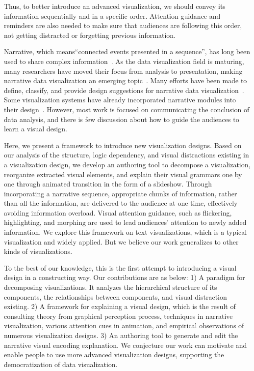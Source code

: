 Thus, to better introduce an advanced visualization, we should convey its information sequentially and in a specific order. Attention guidance and reminders are also needed to make sure that audiences are following this order, not getting distracted or forgetting previous information.

Narrative, which means``connected events presented in a sequence'', has long been used to share complex information~\cite{schmidt_living_2017}. As the data visualization field is maturing, many researchers have moved their focus from analysis to presentation, making narrative data visualization an emerging topic~\cite{kosara_storytelling:_2013}. Many efforts have been
made to define, classify, and provide design suggestions for narrative data visualization~\cite{segel_narrative_2010,hullman_deeper_2013,gershon_what_2001}. Some visualization systems have already incorporated narrative modules into their design~\cite{eccles_stories_2007,bryan_temporal_2016}. However, most work is focused on communicating the conclusion of data analysis, and there is few discussion about how to guide the audiences to learn a visual design. 

Here, we present a framework to introduce new visualization designs. Based on our analysis of the structure, logic dependency, and visual distractions existing in a visualization design, we develop an authoring tool to decompose a visualization, reorganize extracted visual elements, and explain their visual grammars one by one through animated transition in the form of a slideshow. Through incorporating a narrative sequence, appropriate chunks of information, rather than all the information, are delivered to the audience at one time, effectively avoiding information overload. Visual attention guidance, such as flickering, highlighting, and morphing are used to lead audiences' attention to newly added information. We explore this framework on text visualizations, which is a typical visualization and widely applied. But we believe our work generalizes to other kinds of visualizations. 

To the best of our knowledge, this is the first attempt to introducing a visual design in a constructing way. Our contributions are as below: 1) A paradigm for decomposing visualizations. It analyzes the hierarchical structure of its components, the relationships between components, and visual distraction existing. 2) A framework for explaining a visual design, which is the result of consulting theory from graphical perception process, techniques in narrative visualization, various attention cues in animation, and empirical observations of numerous visualization designs. 3) An authoring tool to generate and edit the narrative visual encoding explanation.
 We conjecture our work can motivate and enable people to use more advanced visualization designs, supporting the democratization of data visualization.
 